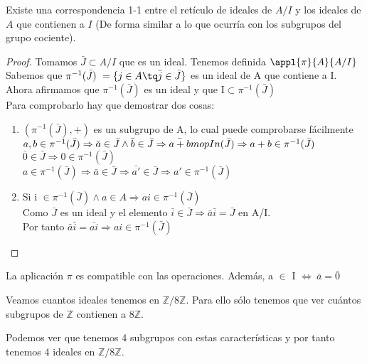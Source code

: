 \documentclass[nochap]{apuntes}
\begin{document}
\begin{lemma}
 Existe una correspondencia 1-1 entre el retículo de ideales de $A/I$ y los ideales de $A$ que contienen a $I$ (De forma similar a lo que ocurría con los subgrupos del grupo cociente).
\end{lemma}
\begin{proof}
 Tomamos $\bar{J}\subset A/I$  que es un ideal. Tenemos definida $\appl{\pi}{A}{A/I}$\\
 Sabemos que $\pi^{-1}(\bar{J})\  =\{j \in A \tq \bar{j} \in \bar{J}\}$  es un ideal de A que contiene a I.\\
 Ahora afirmamos que $\pi^{-1}(\bar{J})$  es un ideal y que I$\subset \pi^{-1}(\bar{J})$\\
 Para comprobarlo hay que demostrar dos cosas:
 \begin{enumerate}
  \item $(\pi^{-1}(\bar{J}), + )$  es un subgrupo de A, lo cual puede comprobarse fácilmente\\
  $a,b \in \pi^{-1}(\bar{J}) \Rightarrow \bar{a}\in \bar{J} \wedge \bar{b}\in\bar{J}  \Rightarrow  \bar{a+b} \\mop{In}(\bar{J}) \Rightarrow a+b \in \pi^{-1}(\bar{J})$\\
  $\bar{0} \in \bar{J} \Rightarrow 0 \in \pi^{-1}(\bar{J})$\\
  $a \in \pi^{-1}(\bar{J}) \Rightarrow \bar{a} \in \bar{J} \Rightarrow \bar{a'}\in \bar{J} \Rightarrow a' \in \pi^{-1}(\bar{J})$\\
  \item Si i $\in\pi^{-1}(\bar{J}) \wedge a \in A \Rightarrow ai\in \pi^{-1}(\bar{J})$\\
  Como $\bar{J}$  es un ideal y el elemento $\bar{i}\in\bar{J} \Rightarrow \bar{a}\bar{i}=\bar{J}$  en A/I.\\
  Por tanto $\bar{a}\bar{i}=\bar{ai} \Rightarrow  ai \in \pi^{-1}(\bar{J})$\\
  \end{enumerate}
\end{proof}

\obs La aplicación $\pi$  es compatible con las operaciones. Además, a $\in$ I $\Leftrightarrow \ \bar{a}=\bar{0}$

\begin{example}
 Veamos cuantos ideales tenemos en $\mathbb{Z}/8\mathbb{Z}$.  Para ello sólo tenemos que ver cuántos subgrupos de $\mathbb{Z}$  contienen a $8\mathbb{Z}$.

 Podemos ver que tenemos 4 subgrupos con estas características y por tanto tenemos 4 ideales en $\mathbb{Z}/8\mathbb{Z}$.
\end{example}
\end{document}
